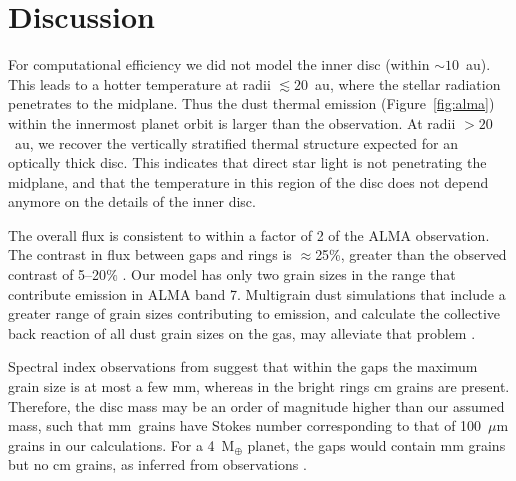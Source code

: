 \documentclass[usenatbib,a4paper,times]{mnras}
\renewcommand{\earth}{\mathrm{M}_{\oplus}}
\begin{document}
\section{Discussion}
\label{sec:discussion}

For computational efficiency we did not model the inner disc (within
$\sim10$~au). This leads to a hotter temperature at radii $\lesssim 20$~au,
where the stellar radiation penetrates to the midplane. Thus the dust thermal
emission (Figure~\ref{fig:alma}) within the innermost planet orbit is
larger than the observation. At radii $>20$~au, we recover the vertically
stratified thermal structure expected for an optically thick disc. This
indicates that direct star light is not penetrating the midplane, and that the
temperature in this region of the disc does not depend anymore on the details of
the inner disc.

The overall flux is consistent to within a factor of 2 of the ALMA observation.
The contrast in flux between gaps and rings is $\approx$25\%, greater than the
observed contrast of 5--20$\%$ \citep{andrews:2016}. Our model has only two
grain sizes in the range that contribute emission in ALMA band 7.  Multigrain
dust simulations that include a greater range of grain sizes contributing to
emission, and calculate the collective back reaction of all dust grain
sizes on the gas, may alleviate that problem \citep{hutchison:2018}.

Spectral index observations from \citet{huang:2018} suggest that within the gaps
the maximum grain size is at most a few mm, whereas in the bright rings cm
grains are present. Therefore, the disc mass may be an order of magnitude higher
than our assumed mass, such that mm~grains have Stokes number corresponding to
that of 100~$\mu$m grains in our calculations. For a 4~$\earth{}$ planet, the
gaps would contain mm grains but no cm grains, as inferred from observations
\citep{huang:2018}.
\end{document}
